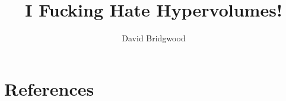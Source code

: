 \documentclass[a4paper,12pt,oneside]{article}
\begin{document}
\title{I Fucking Hate Hypervolumes!}

\author{David Bridgwood}

\maketitle

\preface




\body







\clearpage
\section{References}



\clearpage

\end{document}
